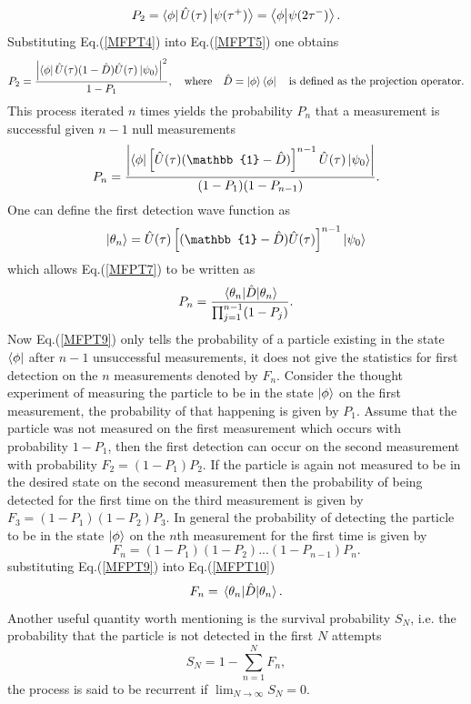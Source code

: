 \documentclass{article}
\numberwithin{equation}{section}
\newcommand{\1}{\mathbb{1}}
\newcommand{\state}{\ket{\phi}}
\newcommand{\projection}{\bra{\phi}}
\begin{document}
\begin{equation}\label{MFPT5}
    P_2=\projection \hat{U}(\tau)\ket{\psi(\tau^+)}=\projection\ket{\psi(2\tau^-)}.
\end{equation}
Substituting Eq.(\ref{MFPT4}) into Eq.(\ref{MFPT5}) one obtains
\begin{equation}\label{MFPT6}
    P_2=\frac{\abs{\projection\hat{U}(\tau)(1-\hat{D})\hat{U}(\tau)\ket{\psi_0}}^2}{1-P_1}, \quad \text{where}\quad \hat{D}=\state\projection \quad \text{is defined as the projection operator.}
\end{equation}
This process iterated $n$ times yields the probability $P_n$ that a measurement is successful given $n-1$ null measurements
\begin{equation}\label{MFPT7}
    P_n=\frac
    {\abs
    {\projection \left[\hat{U}(\tau)(\1-\hat{D})\right]^{n-1}\hat{U}(\tau)\ket{\psi_0}}}
    {(1-P_1)(1-P_{n-1})}.
\end{equation}
One can define the first detection wave function as
\begin{equation}\label{MFPT8}
    \ket{\theta_n}=\hat{U}(\tau)\left[(\1-\hat{D})\hat{U}(\tau)\right]^{n-1}\ket{\psi_0}
\end{equation}
which allows Eq.(\ref{MFPT7}) to be written as
\begin{equation}\label{MFPT9}
    P_n=\frac
    {\ev{\hat{D}}{\theta_n}}
    {\prod_{j=1}^{n-1}(1-P_j)}.
\end{equation}
Now Eq.(\ref{MFPT9}) only tells the probability of a particle existing in the state $\projection$ after $n-1$ unsuccessful measurements, it does not give the statistics for first detection on the $n$ measurements denoted by $F_n$. Consider the thought experiment of measuring the particle to be in the state $\ket{\phi}$ on the first measurement, the probability of that happening is given by $P_1$. Assume that the particle was not measured on the first measurement which occurs with probability $1-P_1$, then the first detection can occur on the second measurement with probability $F_2=(1-P_1)P_2$. If the particle is again not measured to be in the desired state on the second measurement then the probability of being detected for the first time on the third measurement is given by $F_3=(1-P_1)(1-P_2)P_3$. In general the probability of detecting the particle to be in the state $\state$ on the $n$th measurement for the first time is given by 
\begin{equation}\label{MFPT10}
    F_n=(1-P_1)(1-P_2)...(1-P_{n-1})P_n.
\end{equation}
substituting Eq.(\ref{MFPT9}) into Eq.(\ref{MFPT10}) 
\begin{equation}\label{MFPT11}
    F_n=\ev{\hat{D}}{\theta_n}.
\end{equation}
Another useful quantity worth mentioning is the survival probability $S_N$, i.e. the probability that the particle is not detected in the first $N$ attempts
\begin{equation}\label{MFPT12}
    S_N=1-\sum_{n=1}^NF_n,
\end{equation}
the process is said to be recurrent if $\lim_{N\to\infty}S_N=0$.
\end{document}

